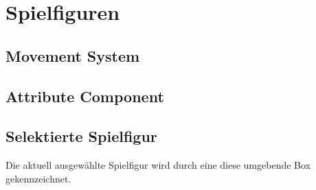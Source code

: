 \chapter{Spielfiguren}

\section{Movement System}

\section{Attribute Component}

\section{Selektierte Spielfigur}
Die aktuell ausgewählte Spielfigur wird durch eine diese umgebende Box gekennzeichnet.
